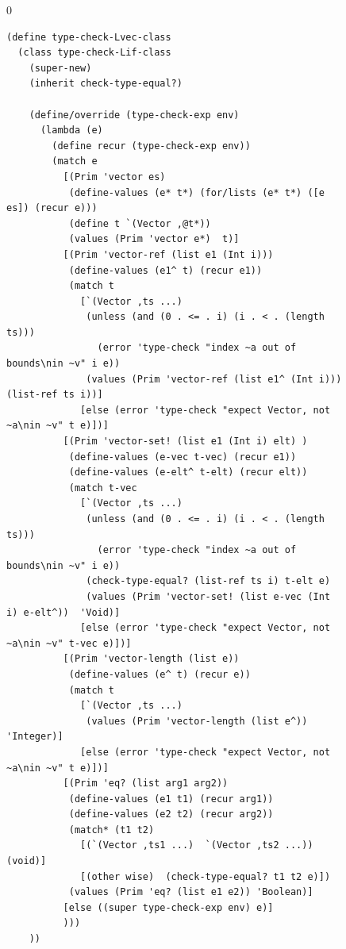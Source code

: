\documentclass[7x10]{TimesAPriori_MIT}%
\def\racketEd{0}
\providecommand{\BookEdition}{1}
\let\edition\BookEdition
\numberwithin{theorem}{chapter}
\numberwithin{definition}{chapter}
\numberwithin{equation}{chapter}
\begin{document}
\begin{figure}[tp]
  \begin{tcolorbox}[colback=white]
    {\if\edition\racketEd
\begin{lstlisting}[basicstyle=\ttfamily\footnotesize]
(define type-check-Lvec-class
  (class type-check-Lif-class
    (super-new)
    (inherit check-type-equal?)

    (define/override (type-check-exp env)
      (lambda (e)
        (define recur (type-check-exp env))
        (match e
          [(Prim 'vector es)
           (define-values (e* t*) (for/lists (e* t*) ([e es]) (recur e)))
           (define t `(Vector ,@t*))
           (values (Prim 'vector e*)  t)]
          [(Prim 'vector-ref (list e1 (Int i)))
           (define-values (e1^ t) (recur e1))
           (match t
             [`(Vector ,ts ...)
              (unless (and (0 . <= . i) (i . < . (length ts)))
                (error 'type-check "index ~a out of bounds\nin ~v" i e))
              (values (Prim 'vector-ref (list e1^ (Int i)))  (list-ref ts i))]
             [else (error 'type-check "expect Vector, not ~a\nin ~v" t e)])]
          [(Prim 'vector-set! (list e1 (Int i) elt) )
           (define-values (e-vec t-vec) (recur e1))
           (define-values (e-elt^ t-elt) (recur elt))
           (match t-vec
             [`(Vector ,ts ...)
              (unless (and (0 . <= . i) (i . < . (length ts)))
                (error 'type-check "index ~a out of bounds\nin ~v" i e))
              (check-type-equal? (list-ref ts i) t-elt e)
              (values (Prim 'vector-set! (list e-vec (Int i) e-elt^))  'Void)]
             [else (error 'type-check "expect Vector, not ~a\nin ~v" t-vec e)])]
          [(Prim 'vector-length (list e))
           (define-values (e^ t) (recur e))
           (match t
             [`(Vector ,ts ...)
              (values (Prim 'vector-length (list e^))  'Integer)]
             [else (error 'type-check "expect Vector, not ~a\nin ~v" t e)])]
          [(Prim 'eq? (list arg1 arg2))
           (define-values (e1 t1) (recur arg1))
           (define-values (e2 t2) (recur arg2))
           (match* (t1 t2)
             [(`(Vector ,ts1 ...)  `(Vector ,ts2 ...))  (void)]
             [(other wise)  (check-type-equal? t1 t2 e)])
           (values (Prim 'eq? (list e1 e2)) 'Boolean)]
          [else ((super type-check-exp env) e)]
          )))
    ))


\end{lstlisting}}
\end{tcolorbox}
\end{figure}
\end{document}
